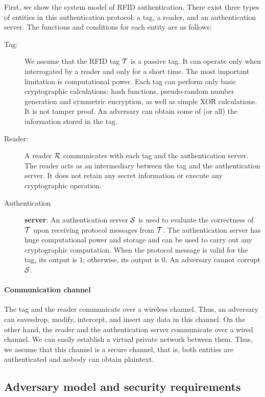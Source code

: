 \documentclass[english]{llncs}
\begin{document}
First, we show the system model of RFID authentication. There exist
three types of entities in this authentication protocol: a tag, a
reader, and an authentication server. The functions and conditions
for each entity are as follows:
\begin{description}
\item [{Tag:}] We assume that the RFID tag ${\cal {T}}$ is a passive tag.
It can operate only when interrogated by a reader and only for a short
time. The most important limitation is computational power. Each tag
can perform only basic cryptographic calculations: hash functions,
pseudo-random number generation and symmetric encryption, as well
as simple XOR calculations. It is not tamper proof. An adversary can
obtain some of (or all) the information stored in the tag.
\item [{Reader:}] A reader ${\cal {R}}$ communicates with each tag and
the authentication server. The reader acts as an intermediary between
the tag and the authentication server. It does not retain any secret
information or execute any cryptographic operation.
\item [{Authentication}] \textbf{server}: An authentication server ${\cal {S}}$
is used to evaluate the correctness of ${\cal T}$ upon receiving
protocol messages from ${\cal {T}}$. The authentication server has
huge computational power and storage and can be used to carry out
any cryptographic computation. When the protocol message is valid
for the tag, its output is $1$; otherwise, its output is $0$. An
adversary cannot corrupt ${\cal {S}}$. 
\end{description}

\paragraph{Communication channel}

The tag and the reader communicate over a wireless channel. Thus,
an adversary can eavesdrop, modify, intercept, and insert any data
in this channel. On the other hand, the reader and the authentication
server communicate over a wired channel. We can easily establish a
virtual private network between them. Thus, we assume that this channel
is a secure channel, that is, both entities are authenticated and
nobody can obtain plaintext.


\subsection{Adversary model and security requirements}
\end{document}
